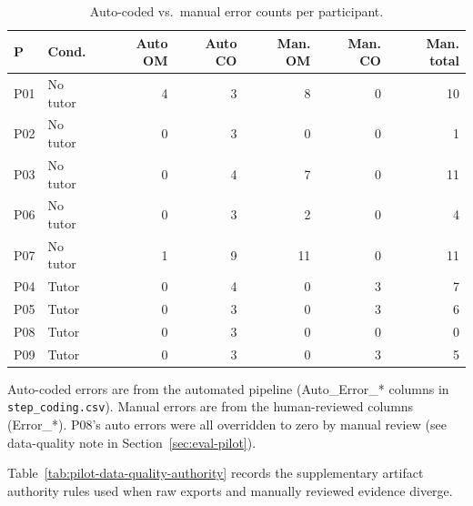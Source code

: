 \begin{table}[htbp]
\centering
\caption{Auto-coded vs.\ manual error counts per participant.}\label{tab:pilot-errors-auto}
\small
\begin{tabular}{@{}llrrrrr@{}}
\toprule
\textbf{P} & \textbf{Cond.} & \textbf{Auto OM} & \textbf{Auto CO} & \textbf{Man. OM} & \textbf{Man. CO} & \textbf{Man. total} \\
\midrule
P01 & No tutor & 4  & 3  & 8  & 0 & 10 \\
P02 & No tutor & 0  & 3  & 0  & 0 & 1  \\
P03 & No tutor & 0  & 4  & 7  & 0 & 11 \\
P06 & No tutor & 0  & 3  & 2  & 0 & 4  \\
P07 & No tutor & 1  & 9  & 11 & 0 & 11 \\
P04 & Tutor    & 0  & 4  & 0  & 3 & 7  \\
P05 & Tutor    & 0  & 3  & 0  & 3 & 6  \\
P08 & Tutor    & 0  & 3  & 0  & 0 & 0  \\
P09 & Tutor    & 0  & 3  & 0  & 3 & 5  \\
\bottomrule
\end{tabular}

Auto-coded errors are from the automated pipeline (Auto\_Error\_* columns in
\texttt{step\_coding.csv}). Manual errors are from the human-reviewed columns
(Error\_*). P08's auto errors were all overridden to zero by manual review
(see data-quality note in Section~\ref{sec:eval-pilot}).
\end{table}

Table~\ref{tab:pilot-data-quality-authority} records the supplementary
artifact authority rules used when raw exports and manually reviewed evidence
diverge.

